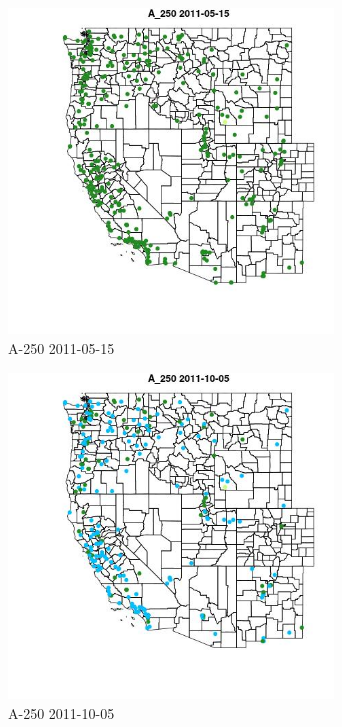 \begin{figure} 
\centering  
\includegraphics[width=0.77\textwidth]{Code_Outputs/ML_input_report_ML_input_PM25_Step5_part_d_de_duplicated_aves_ML_input_MapObsA_2502011-05-15.jpg} 
\caption{\label{fig:ML_input_report_ML_input_PM25_Step5_part_d_de_duplicated_aves_ML_inputMapObsA_2502011-05-15}A-250 2011-05-15} 
\end{figure} 
 

\clearpage 

\begin{figure} 
\centering  
\includegraphics[width=0.77\textwidth]{Code_Outputs/ML_input_report_ML_input_PM25_Step5_part_d_de_duplicated_aves_ML_input_MapObsA_2502011-10-05.jpg} 
\caption{\label{fig:ML_input_report_ML_input_PM25_Step5_part_d_de_duplicated_aves_ML_inputMapObsA_2502011-10-05}A-250 2011-10-05} 
\end{figure} 
 

